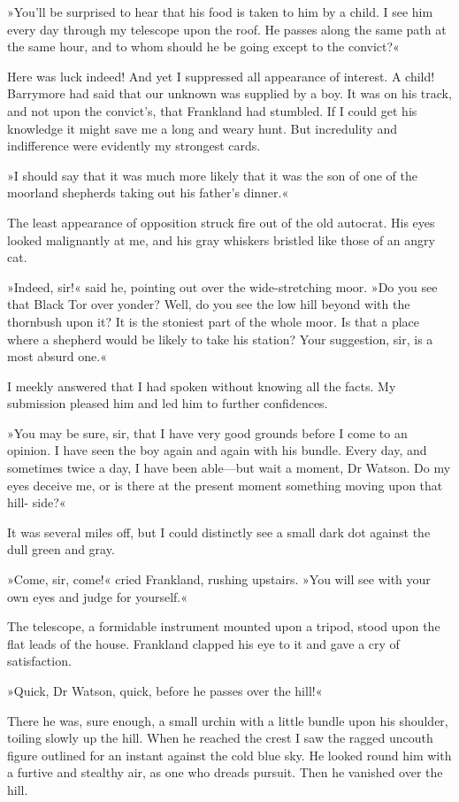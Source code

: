 »You'll be surprised to hear that his food is taken to him by a child. I see him every day through my telescope upon the roof. He passes along the same path at the same hour, and to whom should he be going except to the convict?«

Here was luck indeed! And yet I suppressed all appearance of interest. A child! Barrymore had said that our unknown was supplied by a boy. It was on his track, and not upon the convict's, that Frankland had stumbled. If I could get his knowledge it might save me a long and weary hunt. But incredulity and indifference were evidently my strongest cards.

»I should say that it was much more likely that it was the son of one of the moorland shepherds taking out his father's dinner.«

The least appearance of opposition struck fire out of the old autocrat. His eyes looked malignantly at me, and his gray whiskers bristled like those of an angry cat.

»Indeed, sir!« said he, pointing out over the wide-stretching moor. »Do you see that Black Tor over yonder? Well, do you see the low hill beyond with the thornbush upon it? It is the stoniest part of the whole moor. Is that a place where a shepherd would be likely to take his station? Your suggestion, sir, is a most absurd one.«

I meekly answered that I had spoken without knowing all the facts. My submission pleased him and led him to further confidences.

»You may be sure, sir, that I have very good grounds before I come to an opinion. I have seen the boy again and again with his bundle. Every day, and sometimes twice a day, I have been able—but wait a moment, Dr Watson. Do my eyes deceive me, or is there at the present moment something moving upon that hill- side?«

It was several miles off, but I could distinctly see a small dark dot against the dull green and gray.

»Come, sir, come!« cried Frankland, rushing upstairs. »You will see with your own eyes and judge for yourself.«

The telescope, a formidable instrument mounted upon a tripod, stood upon the flat leads of the house. Frankland clapped his eye to it and gave a cry of satisfaction.

»Quick, Dr Watson, quick, before he passes over the hill!«

There he was, sure enough, a small urchin with a little bundle upon his shoulder, toiling slowly up the hill. When he reached the crest I saw the ragged uncouth figure outlined for an instant against the cold blue sky. He looked round him with a furtive and stealthy air, as one who dreads pursuit. Then he vanished over the hill.


